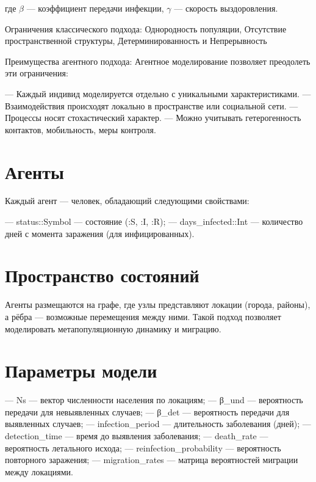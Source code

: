 \documentclass[
  12pt,
  a4paper,
  DIV=11,
  numbers=noendperiod]{scrreprt}
\begin{document}
где \(\beta\) --- коэффициент передачи инфекции, \(\gamma\) --- скорость
выздоровления.

Ограничения классического подхода: Однородность популяции, Отсутствие
пространственной структуры, Детерминированность и Непрерывность

Преимущества агентного подхода: Агентное моделирование позволяет
преодолеть эти ограничения:

--- Каждый индивид моделируется отдельно с уникальными характеристиками.
--- Взаимодействия происходят локально в пространстве или социальной
сети. --- Процессы носят стохастический характер. --- Можно учитывать
гетерогенность контактов, мобильность, меры контроля.

\section{Агенты}\label{ux430ux433ux435ux43dux442ux44b}

Каждый агент --- человек, обладающий следующими свойствами:

--- status::Symbol --- состояние (:S, :I, :R); --- days\_infected::Int
--- количество дней с момента заражения (для инфицированных).

\section{Пространство
состояний}\label{ux43fux440ux43eux441ux442ux440ux430ux43dux441ux442ux432ux43e-ux441ux43eux441ux442ux43eux44fux43dux438ux439}

Агенты размещаются на графе, где узлы представляют локации (города,
районы), а рёбра --- возможные перемещения между ними. Такой подход
позволяет моделировать метапопуляционную динамику и миграцию.

\section{Параметры
модели}\label{ux43fux430ux440ux430ux43cux435ux442ux440ux44b-ux43cux43eux434ux435ux43bux438}

--- Ns --- вектор численности населения по локациям; --- β\_und ---
вероятность передачи для невыявленных случаев; --- β\_det ---
вероятность передачи для выявленных случаев; --- infection\_period ---
длительность заболевания (дней); --- detection\_time --- время до
выявления заболевания; --- death\_rate --- вероятность летального
исхода; --- reinfection\_probability --- вероятность повторного
заражения; --- migration\_rates --- матрица вероятностей миграции между
локациями.
\end{document}
